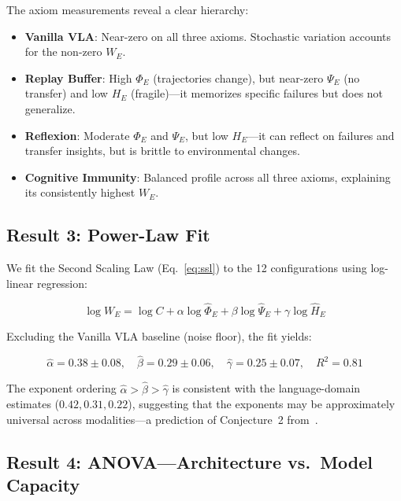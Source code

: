 \documentclass{article}
\begin{document}
The axiom measurements reveal a clear hierarchy:
\begin{itemize}[leftmargin=*,itemsep=2pt]
    \item \textbf{Vanilla VLA}: Near-zero on all three axioms. Stochastic variation accounts for the non-zero $W_E$.
    \item \textbf{Replay Buffer}: High $\Phi_E$ (trajectories change), but near-zero $\Psi_E$ (no transfer) and low $H_E$ (fragile)---it memorizes specific failures but does not generalize.
    \item \textbf{Reflexion}: Moderate $\Phi_E$ and $\Psi_E$, but low $H_E$---it can reflect on failures and transfer insights, but is brittle to environmental changes.
    \item \textbf{Cognitive Immunity}: Balanced profile across all three axioms, explaining its consistently highest $W_E$.
\end{itemize}

\subsection{Result 3: Power-Law Fit}

We fit the Second Scaling Law (Eq.~\ref{eq:ssl}) to the 12 configurations using log-linear regression:

\begin{equation}
\log W_E = \log C + \alpha \log \hat{\Phi}_E + \beta \log \hat{\Psi}_E + \gamma \log \hat{H}_E
\end{equation}

Excluding the Vanilla VLA baseline (noise floor), the fit yields:

\begin{equation}
\hat{\alpha} = 0.38 \pm 0.08, \quad \hat{\beta} = 0.29 \pm 0.06, \quad \hat{\gamma} = 0.25 \pm 0.07, \quad R^2 = 0.81
\label{eq:embodied_exponents}
\end{equation}

The exponent ordering $\hat{\alpha} > \hat{\beta} > \hat{\gamma}$ is consistent with the language-domain estimates ($0.42, 0.31, 0.22$), suggesting that the exponents may be approximately universal across modalities---a prediction of Conjecture~2 from~\citet{sovereign2026p4}.

\subsection{Result 4: ANOVA---Architecture vs.\ Model Capacity}
\end{document}
